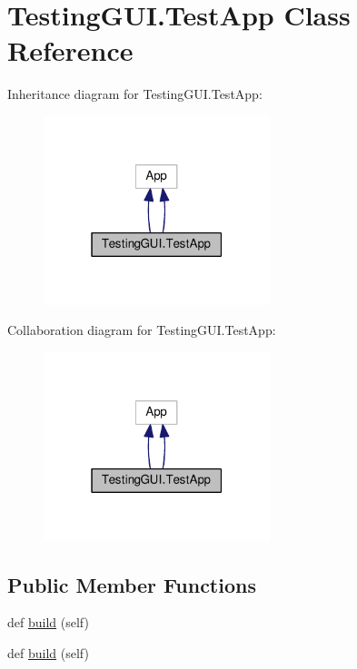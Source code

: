 \hypertarget{classTestingGUI_1_1TestApp}{}\section{Testing\+G\+U\+I.\+Test\+App Class Reference}
\label{classTestingGUI_1_1TestApp}


Inheritance diagram for Testing\+G\+U\+I.\+Test\+App\+:
\nopagebreak
\begin{figure}[H]
\begin{center}
\leavevmode
\includegraphics[width=187pt]{classTestingGUI_1_1TestApp__inherit__graph}
\end{center}
\end{figure}


Collaboration diagram for Testing\+G\+U\+I.\+Test\+App\+:
\nopagebreak
\begin{figure}[H]
\begin{center}
\leavevmode
\includegraphics[width=187pt]{classTestingGUI_1_1TestApp__coll__graph}
\end{center}
\end{figure}
\subsection*{Public Member Functions}
\begin{DoxyCompactItemize}
\item 
def \hyperlink{classTestingGUI_1_1TestApp_ae400da04ab73e37a37943e36a1a90fd7}{build} (self)
\item 
def \hyperlink{classTestingGUI_1_1TestApp_ae400da04ab73e37a37943e36a1a90fd7}{build} (self)
\end{DoxyCompactItemize}
